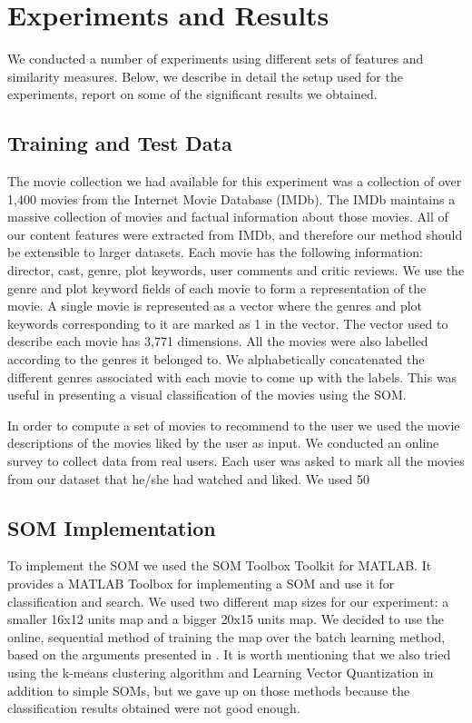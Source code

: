 \documentclass[conference]{IEEEtran}
\begin{document}
\section{Experiments and Results}
We conducted a number of experiments using different sets of features and similarity measures. Below, we describe in detail the setup used for the experiments, report on some of the significant results we obtained. 

\subsection{Training and Test Data}

The movie collection we had available for this experiment was a collection of over 1,400 movies from the Internet Movie Database (IMDb). The IMDb maintains a massive collection of movies and factual information about those movies. All of our content features were extracted from IMDb, and therefore our method should be extensible to larger datasets. Each movie has the following information: director, cast, genre, plot keywords, user comments and critic reviews. We use the genre and plot keyword fields of each movie to form a representation of the movie. A single movie is represented as a vector where the genres and plot keywords corresponding to it are marked as 1 in the vector. The vector used to describe each movie has 3,771 dimensions. All the movies were also labelled according to the genres it belonged to. We alphabetically concatenated the different genres associated with each movie to come up with the labels. This was useful in presenting a visual classification of the movies using the SOM.

In order to compute a set of movies to recommend to the user we used the movie descriptions of the movies liked by the user as input. We conducted an online survey to collect data from real users. Each user was asked to mark all the movies from our dataset that he/she had watched and liked. We used 50%

\subsection{SOM Implementation}

To implement the SOM we used the SOM Toolbox Toolkit for MATLAB. It provides a MATLAB Toolbox for implementing a SOM and use it for classification and search. We used two different map sizes for our experiment: a smaller 16x12 units map and a bigger 20x15 units map. We decided to use the online, sequential method of training the map over the batch learning method, based on the arguments presented in \cite{fort2002advantages}. It is worth mentioning that we also tried using the k-means clustering algorithm \cite{hartigan1979algorithm} and Learning Vector Quantization \cite{kohonen1997learning} in addition to simple SOMs, but we gave up on those methods because the classification results obtained were not good enough. 
\end{document}
